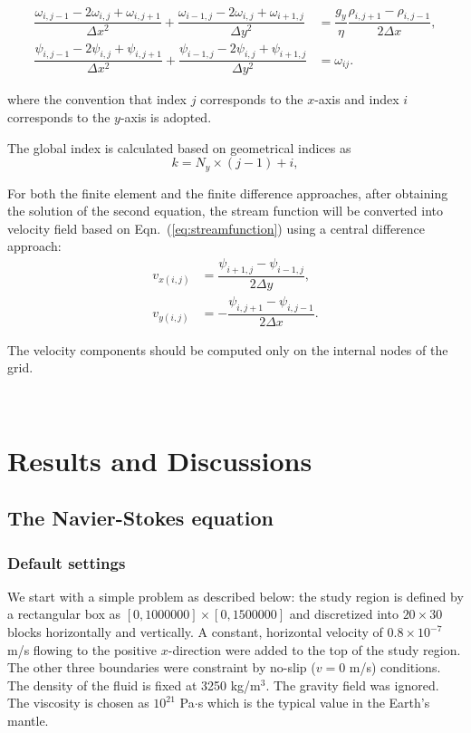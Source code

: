 \documentclass[11pt]{article}
\numberwithin{figure}{section}  %
\numberwithin{equation}{section}  %
\begin{document}
\begin{align*}
    \dfrac{\omega_{i,j-1}-2\omega_{i,j}+\omega_{i,j+1}}{\Delta{x}^2} + \dfrac{\omega_{i-1,j}-2\omega_{i,j}+\omega_{i+1,j}}{\Delta{y}^2} &= \dfrac{g_y}{\eta}\dfrac{\rho_{i,j+1}-\rho_{i,j-1}}{2\Delta{x}}, \\
    \dfrac{\psi_{i,j-1}-2\psi_{i,j}+\psi_{i,j+1}}{\Delta{x}^2} + \dfrac{\psi_{i-1,j}-2\psi_{i,j}+\psi_{i+1,j}}{\Delta{y}^2} &= \omega_{ij}.
\end{align*}
\begin{multicols}{2}
where the convention that index $j$ corresponds to the $x$-axis and index $i$ corresponds to the $y$-axis is adopted.

The global index is calculated based on geometrical indices as
\begin{equation}
    k = N_y\times(j-1)+i,
\end{equation}

For both the finite element and the finite difference approaches, after obtaining the solution of the second equation, the stream function will be converted into velocity field based on Eqn.\ (\ref{eq:streamfunction}) using a central difference approach:
\begin{align*}
    v_{x(i,j)} &= \dfrac{\psi_{i+1,j}-\psi_{i-1,j}}{2\Delta{y}}, \\
    v_{y(i,j)} &= -\dfrac{\psi_{i,j+1}-\psi_{i,j-1}}{2\Delta{x}}.
\end{align*}

The velocity components should be computed only on the internal nodes of the grid.

~\\

\section{Results and Discussions}

\subsection{The Navier-Stokes equation}

\subsubsection{Default settings}

We start with a simple problem as described below: the study region is defined by a rectangular box as $[0,1000000]\times[0,1500000]$ and discretized into $20\times30$ blocks horizontally and vertically. A constant, horizontal velocity of $0.8\times10^{-7}$ m/s flowing to the positive $x$-direction were added to the top of the study region. The other three boundaries were constraint by no-slip ($v=0$ m/s) conditions. The density of the fluid is fixed at 3250 kg/m$^3$. The gravity field was ignored. The viscosity is chosen as $10^{21}$ Pa$\cdot$s which is the typical value in the Earth's mantle.


\end{multicols}
\end{document}
